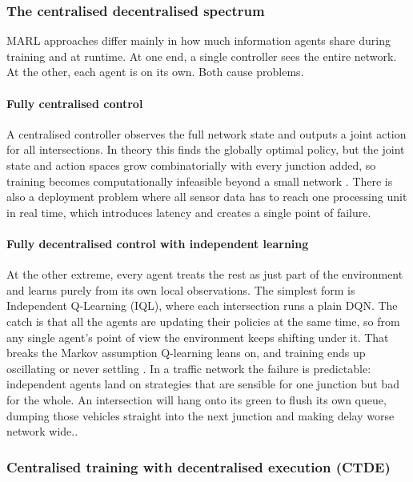 ﻿\documentclass[11pt, a4paper]{report}
\begin{document}
\subsubsection{The centralised decentralised spectrum}

MARL approaches differ mainly in how much information agents share during training and at runtime. At one end, a single controller sees the entire network. At the other, each agent is on its own. Both cause problems.

\paragraph{Fully centralised control}

A centralised controller observes the full network state and outputs a joint action for all intersections. In theory this finds the globally optimal policy, but the joint state and action spaces grow combinatorially with every junction added, so training becomes computationally infeasible beyond a small network \cite{mannion2016experimental}. There is also a deployment problem where all sensor data has to reach one processing unit in real time, which introduces latency and creates a single point of failure.

\paragraph{Fully decentralised control with independent learning}

At the other extreme, every agent treats the rest as just part of the environment and learns purely from its own local observations. The simplest form is Independent Q-Learning (IQL), where each intersection runs a plain DQN. The catch is that all the agents are updating their policies at the same time, so from any single agent's point of view the environment keeps shifting under it. That breaks the Markov assumption Q-learning leans on, and training ends up oscillating or never settling \cite{tan1993multi}. In a traffic network the failure is predictable: independent agents land on strategies that are sensible for one junction but bad for the whole. An intersection will hang onto its green to flush its own queue, dumping those vehicles straight into the next junction and making delay worse network wide..

\subsubsection{Centralised training with decentralised execution (CTDE)}
\end{document}
